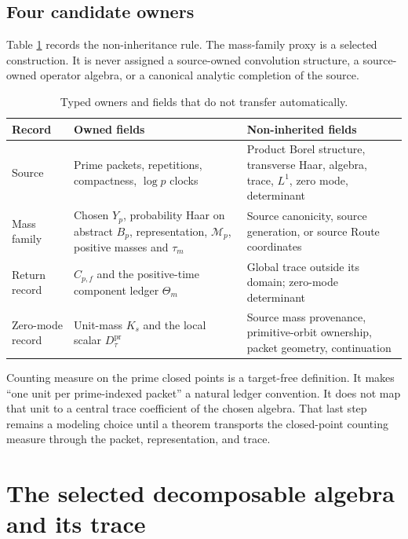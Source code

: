 \documentclass[11pt,a4paper]{article}
\theoremstyle{definition}
\newcommand{\M}{\mathcal M}
\newcommand{\Dtau}{D^{\mathrm{pr}}_{\tau}}
\begin{document}
\subsection{Four candidate owners}

Table \ref{tab:owners} records the non-inheritance rule.  The mass-family
proxy is a selected construction.  It is never assigned a source-owned
convolution structure, a source-owned operator algebra, or a canonical
analytic completion of the source.

\begin{table}[htbp]
\centering
\caption{Typed owners and fields that do not transfer automatically.}
\label{tab:owners}
\small
\begin{tabularx}{\textwidth}{@{}p{}X X@{}}
\toprule
Record & Owned fields & Non-inherited fields \\
\midrule
Source & Prime packets, repetitions, compactness, $\log p$ clocks & Product
Borel structure, transverse Haar, algebra, trace, $L^1$, zero mode,
determinant \\
Mass family & Chosen $Y_p$, probability Haar on abstract $B_p$, representation,
$\M_p$, positive masses and $\tau_m$ & Source canonicity, source generation,
or source Route coordinates \\
Return record & $C_{p,f}$ and the positive-time component ledger $\Theta_m$ &
Global trace outside its domain; zero-mode determinant \\
Zero-mode record & Unit-mass $K_s$ and the local scalar $\Dtau$ & Source mass
provenance, primitive-orbit ownership, packet geometry, continuation \\
\bottomrule
\end{tabularx}
\end{table}

Counting measure on the prime closed points is a target-free definition.  It
makes ``one unit per prime-indexed packet'' a natural ledger convention.  It
does not map that unit to a central trace coefficient of the chosen algebra.
That last step remains a modeling choice until a theorem transports the
closed-point counting measure through the packet, representation, and trace.

\section{The selected decomposable algebra and its trace}
\label{sec:algebra}
\end{document}
